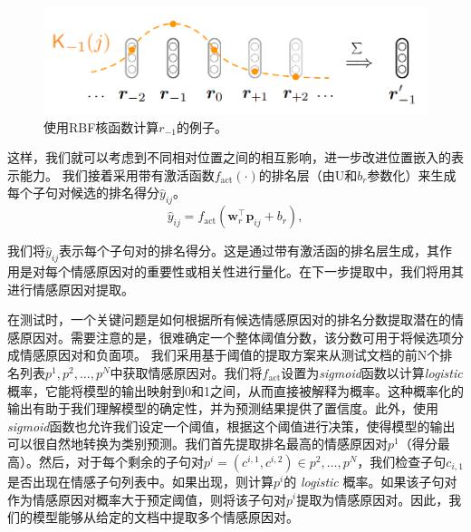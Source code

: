 \begin{figure}[ht]
	\centering
    \includegraphics[width=0.7\linewidth]{figures/kernel.png}
	\caption{使用RBF核函数计算$r_{-1}$的例子。}
    \label{fig:kernel}
\end{figure}

这样，我们就可以考虑到不同相对位置之间的相互影响，进一步改进位置嵌入的表示能力。
我们接着采用带有激活函数$f_{\text{act}}(\cdot)$的排名层（由U和$b_r$参数化）来生成每个子句对候选的排名得分$\hat{y}_{ij}$。
\vspace{3pt}  \begin{equation}
    \hat{y}_{ij}=f_{\mathrm{act}}\left(\boldsymbol{w}_r^\top\boldsymbol{p}_{ij}+b_r\right),
\end{equation} \vspace{4pt}

我们将$\hat{y}_{ij}$表示每个子句对的排名得分。这是通过带有激活函的排名层生成，其作用是对每个情感原因对的重要性或相关性进行量化。在下一步提取中，我们将用其进行情感原因对提取。




在测试时，一个关键问题是如何根据所有候选情感原因对的排名分数提取潜在的情感原因对。需要注意的是，很难确定一个整体阈值分数，该分数可用于将候选项分成情感原因对和负面项。
我们采用基于阈值的提取方案来从测试文档的前N个排名列表${p^1,p^2,...,p^N}$中获取情感原因对。我们将$f_{\mathrm{act}}$设置为\textit{sigmoid}函数以计算\textit{logistic} 概率，它能将模型的输出映射到0和1之间，从而直接被解释为概率。这种概率化的输出有助于我们理解模型的确定性，并为预测结果提供了置信度。此外，使用\textit{sigmoid}函数也允许我们设定一个阈值，根据这个阈值进行决策，使得模型的输出可以很自然地转换为类别预测。我们首先提取排名最高的情感原因对$p^1$（得分最高）。然后，对于每个剩余的子句对$p^i = (c^{i,1},c^{i,2})\in {p^2,\ldots,p^N}$，我们检查子句$c_{i,1}$是否出现在情感子句列表中。如果出现，则计算$p^i$的 \textit{logistic} 概率。如果该子句对作为情感原因对概率大于预定阈值，则将该子句对$p^i$提取为情感原因对。因此，我们的模型能够从给定的文档中提取多个情感原因对。


